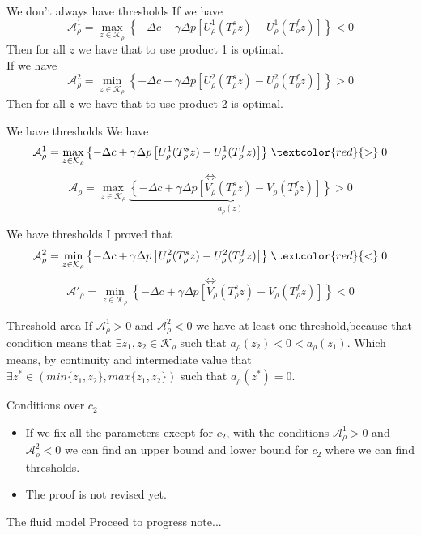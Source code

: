 \documentclass{beamer}
\begin{document}
\begin{frame}{We don't always have thresholds}
    If we have $$\mathcal A^1_\rho =\max_{z\in\mathcal K_\rho}
    \left\{-\Delta c+\gamma\Delta p \left[U_\rho^1(T_\rho^s z)-U_\rho^1(T_\rho^f z)\right]\right\} <0$$
    Then for all $z$ we have that to use product 1 is optimal.  \\
    If we have   $$\mathcal A^2_\rho =\min_{z\in\mathcal K_\rho}
    \left\{-\Delta c+\gamma\Delta p \left[U_\rho^2(T_\rho^s z)-U_\rho^2(T_\rho^f z)\right]\right\} >0$$ Then for all $z$ we have that to use product 2 is optimal. 
\end{frame}

\begin{frame}{We have thresholds}
    We have $$\mathcal A^1_\rho =\max_{z\in\mathcal K_\rho}
    \left\{-\Delta c+\gamma\Delta p \left[U_\rho^1(T_\rho^s z)-U_\rho^1(T_\rho^f z)\right]\right\} \mathrel{\textcolor{red}{>}}0$$
    $$\iff$$
    $$\mathcal A_\rho = \max_{z\in\mathcal K_\rho}
    \underbrace{\left\{-\Delta c+\gamma\Delta p \left[V_\rho(T_\rho^s z)-V_\rho(T_\rho^f z)\right]\right\}}_{a_\rho(z)} >0$$
\end{frame}

\begin{frame}{We have thresholds}
    I proved that
    $$\mathcal A^2_\rho =\min_{z\in\mathcal K_\rho}
    \left\{-\Delta c+\gamma\Delta p \left[U_\rho^2(T_\rho^s z)-U_\rho^2(T_\rho^f z)\right]\right\} \mathrel{\textcolor{red}{<}}0$$
    $$\iff$$
    $$\mathcal A'_\rho = \min_{z\in\mathcal K_\rho}
    \left\{-\Delta c+\gamma\Delta p \left[V_\rho(T_\rho^s z)-V_\rho(T_\rho^f z)\right]\right\} <0$$ 
\end{frame}

\begin{frame}{Threshold area}
    If $\mathcal A^1_\rho>0$ and $\mathcal A^2_\rho<0$ we have at least one threshold,because that condition means that $\exists z_1,z_2\in \mathcal K_\rho$ such that $a_\rho(z_2)<0<a_\rho(z_1)$. Which means, by continuity and intermediate value that $\exists z^*\in (min\{z_1,z_2\},max\{z_1,z_2\})$ such that $a_\rho(z^*)=0.$
\end{frame}

\begin{frame}{Conditions over $c_2$}
    \begin{itemize}
        \item If we fix all the parameters except for $c_2$, with the conditions $\mathcal A^1_\rho>0$ and $\mathcal A^2_\rho<0$ we can find an upper bound and lower bound for $c_2$ where we can find thresholds. 
        \item The proof is not revised yet.  
    \end{itemize}
\end{frame}

\begin{frame}{The fluid model}
    Proceed to progress note...
\end{frame}
\end{document}
